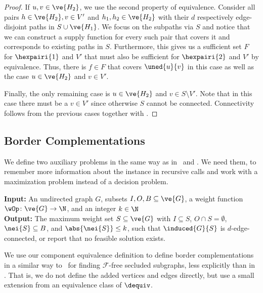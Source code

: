\begin{lemma}
\begin{lemma}
\begin{lemma}
\begin{lemma}
\begin{lemma}
\begin{proof}
  If $u, v \in \ve{H_2}$, we use the second property of equivalence. Consider all pairs $h \in \ve{H_2}, v \in V'$ and $h_1, h_2 \in \ve{H_2}$ with their $d$ respectively edge-disjoint paths in $S \cup \ve{H_1}$. We focus on the subpaths via $S$ and notice that we can construct a supply function for every such pair that covers it and corresponds to existing paths in $S$. Furthermore, this gives us a sufficient set $F$ for $\hexpairi{1}$ and $V'$ that must also be sufficient for $\hexpairi{2}$ and $V'$ by equivalence. Thus, there is $f \in F$ that covers $\uned{u}{v}$ in this case as well as the case $u \in \ve{H_2}$ and $v \in V'$.

  Finally, the only remaining case is $u \in \ve{H_2}$ and $v \in S \setminus V'$. Note that in this case there must be a $v \in V'$ since otherwise $S$ cannot be connected. Connectivity follows from the previous cases together with .
\end{proof}
\fi

\subsection{Border Complementations}\label{sec:d_edge_bc}

We define two auxiliary problems in the same way as in~\cite{golovach2020finding} and . We need them, to remember more information about the instance in recursive calls and work with a maximization problem instead of a decision problem.
\begin{tcolorbox}[enhanced,title={\color{black} {\probrec{}}}, colback=white, boxrule=0.4pt,
	attach boxed title to top left={xshift=.3cm, yshift*=-2.5mm},
	boxed title style={size=small,frame hidden,colback=white}]
	
	\textbf{Input:}  
  An undirected graph $G$, subsets $I,O,B \subseteq \ve{G}$, a weight function $\wOp \colon \ve{G} \to \N$, and an integer $k \in \N$\\

	\textbf{Output:}
  The maximum weight set $S \subseteq \ve{G}$ with $I \subseteq S$, $O \cap S = \emptyset$, $\nei{S} \subseteq B$, and $\abs{\nei{S}} \le k$, such that $\induced{G}{S}$ is $d$-edge-connected, or report that no feasible solution exists.
\end{tcolorbox}


We use our component equivalence definition to define border complementations in a similar way to~\cite{golovach2020finding} for finding $\mathcal{F}$-free secluded subgraphs, less explicitly than in . That is, we do not define the added vertices and edges directly, but use a small extension from an equivalence class of $\dequiv$.


\end{lemma}
\end{lemma}
\end{lemma}
\end{lemma}
\end{lemma}
